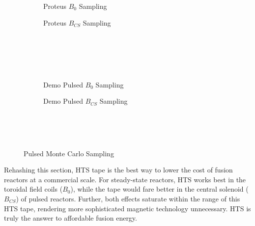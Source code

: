 \begin{figure*}
    \centering
    \hfill 
    \begin{subfigure}[t]{0.45\textwidth}
        \centering
		\begin{adjustbox}{width=\textwidth}
			\Large
			
		\end{adjustbox}
        \caption{Proteus $B_0$ Sampling}
    \end{subfigure}
    \hfill
    \begin{subfigure}[t]{0.45\textwidth}
        \centering
		\begin{adjustbox}{width=\textwidth}
			\Large
			
		\end{adjustbox}
        \caption{Proteus $B_{CS}$ Sampling}
    \end{subfigure}
    \hfill \hfill ~\\ ~\\ ~\\ ~\\
    \hfill 
    \begin{subfigure}[t]{0.45\textwidth}
        \centering
		\begin{adjustbox}{width=\textwidth}
			\Large
			
		\end{adjustbox}
        \caption{Demo Pulsed $B_0$ Sampling}
    \end{subfigure}
    \hfill
    \begin{subfigure}[t]{0.45\textwidth}
        \centering
		\begin{adjustbox}{width=\textwidth}
			\Large
			
		\end{adjustbox}
        \caption{Demo Pulsed $B_{CS}$ Sampling}
    \end{subfigure}	
    \hfill \hfill ~\\ ~\\ ~\\
    \caption{Pulsed Monte Carlo Sampling}
    \label{fig:pulsed_samplings}
\end{figure*}

Rehashing this section, HTS tape is the best way to lower the cost of fusion reactors at a commercial scale. For steady-state reactors, HTS works best in the toroidal field coils ($B_0$), while the tape would fare better in the central solenoid ($B_{CS}$) of pulsed reactors. Further, both effects saturate within the range of this HTS tape, rendering more sophisticated magnetic technology unnecessary. HTS is truly the answer to affordable fusion energy.

